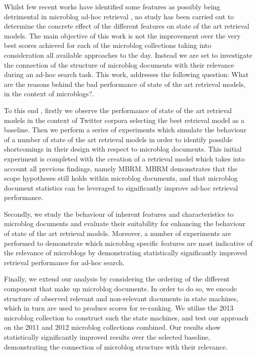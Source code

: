 Whilst few recent works have identified some features as possibly being detrimental in microblog ad-hoc retrieval \cite{singhal1996pivoted,naveed2011searching}, no study has been carried out to determine the concrete effect of the different features on state of the art retrieval models. The main objective of this work is not the improvement over the very best scores achieved for each of the microblog collections taking into consideration all available approaches to the day. Instead we are set to investigate the connection of the structure of microblog documents with their relevance during an ad-hoc search task. This work, addresses the following question: What are the reasons behind the bad performance of state of the art retrieval models, in the context of microblogs?.

To this end , firstly we observe the performance of state of the art retrieval models in the context of Twitter corpora selecting the best retrieval model as a baseline. Then we perform a series of experiments which simulate the behaviour of a number of state of the art retrieval models in order to identify possible shortcomings in their design with respect to microblog documents. This initial experiment is completed with the creation of a retrieval model which takes into account all previous findings, namely MBRM. MBRM demonstrates that the scope hypotheses still holds within microblog documents, and that microblog document statistics can be leveraged to significantly improve ad-hoc retrieval performance.

Secondly, we study the behaviour of inherent features and characteristics to microblog documents and evaluate their suitability for enhancing the behaviour of state of the art retrieval models. Moreover, a number of experiments are performed to demonstrate which microblog specific features are most indicative of the relevance of microblogs by demonstrating statistically significantly improved retrieval performance for ad-hoc search.

Finally, we extend our analysis by considering the ordering of the different component that make up microblog documents. In order to do so, we encode structure of observed relevant and non-relevant documents in state machines, which in turn are used to produce scores for re-ranking. We utilise the 2013 microblog collection to construct such the state machines, and test our approach on the 2011 and 2012 microblog collections combined. Our results show statistically significantly improved results over the selected baseline, demonstrating the connection of microblog structure with their relevance.

